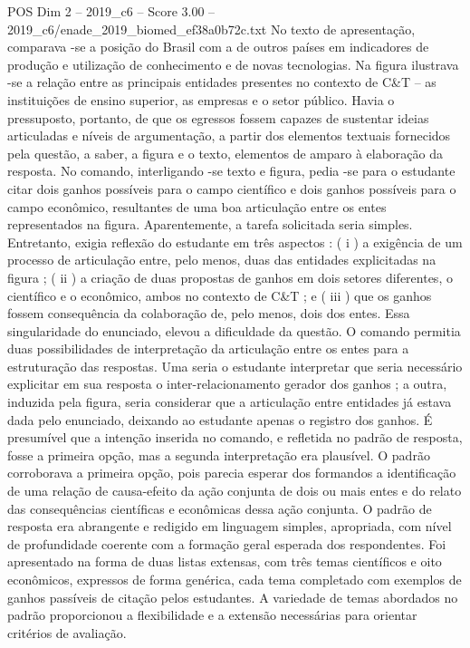 \begin{textsample}{POS Dim 2 – 2019\_c6 – Score 3.00 – 2019\_c6/enade\_2019\_biomed\_ef38a0b72c.txt}
No texto de apresentação, comparava -se a posição do Brasil com a de outros países em indicadores de produção e utilização de conhecimento e de novas tecnologias.
Na figura ilustrava -se a relação entre as principais entidades presentes no contexto de C\&T – as instituições de ensino superior, as empresas e o setor público.
Havia o pressuposto, portanto, de que os egressos fossem capazes de sustentar ideias articuladas e níveis de argumentação, a partir dos elementos textuais fornecidos pela questão, a saber, a figura e o texto, elementos de amparo à elaboração da resposta.
No comando, interligando -se texto e figura, pedia -se para o estudante citar dois ganhos possíveis para o campo científico e dois ganhos possíveis para o campo econômico, resultantes de uma boa articulação entre os entes representados na figura.
Aparentemente, a tarefa solicitada seria simples.
Entretanto, exigia reflexão do estudante em três aspectos : ( i ) a exigência de um processo de articulação entre, pelo menos, duas das entidades explicitadas na figura ; ( ii ) a criação de duas propostas de ganhos em dois setores diferentes, o científico e o econômico, ambos no contexto de C\&T ; e ( iii ) que os ganhos fossem consequência da colaboração de, pelo menos, dois dos entes.
Essa singularidade do enunciado, elevou a dificuldade da questão.
O comando permitia duas possibilidades de interpretação da articulação entre os entes para a estruturação das respostas.
Uma seria o estudante interpretar que seria necessário explicitar em sua resposta o inter-relacionamento gerador dos ganhos ; a outra, induzida pela figura, seria considerar que a articulação entre entidades já estava dada pelo enunciado, deixando ao estudante apenas o registro dos ganhos.
É presumível que a intenção inserida no comando, e refletida no padrão de resposta, fosse a primeira opção, mas a segunda interpretação era plausível.
O padrão corroborava a primeira opção, pois parecia esperar dos formandos a identificação de uma relação de causa-efeito da ação conjunta de dois ou mais entes e do relato das consequências científicas e econômicas dessa ação conjunta.
O padrão de resposta era abrangente e redigido em linguagem simples, apropriada, com nível de profundidade coerente com a formação geral esperada dos respondentes.
Foi apresentado na forma de duas listas extensas, com três temas científicos e oito econômicos, expressos de forma genérica, cada tema completado com exemplos de ganhos passíveis de citação pelos estudantes.
A variedade de temas abordados no padrão proporcionou a flexibilidade e a extensão necessárias para orientar critérios de avaliação.

\end{textsample}
